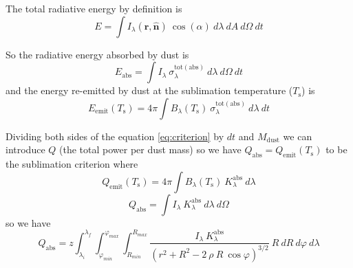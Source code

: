 \documentclass[twocolumn]{aastex62}
\begin{document}
The total radiative energy by definition \citep{mihalas1978book} is
\begin{equation}
E = \int I_{\lambda}(\textbf{r}, \hat{\textbf{n}})\ \cos(\alpha)\ d\lambda\ dA\ d\Omega\ dt
\end{equation}

So the radiative energy absorbed by dust is
\begin{equation}
E_{\mathrm{abs}} = \int I_{\lambda}\ \sigma^{\mathrm{tot(abs)}}_{\lambda}\ d\lambda\ d\Omega\ dt
\end{equation}
and the energy re-emitted by dust \citep{Loska1993} at the sublimation temperature ($T_{\mathrm{s}}$) is
\begin{equation}
E_{\mathrm{emit}}(T_{\mathrm{s}}) = 4 \pi \int B_{\lambda}(T_{\mathrm{s}})\ \sigma^{\mathrm{tot(abs)}}_{\lambda}\ d\lambda\ dt
\end{equation}

Dividing both sides of the equation \ref{eq:criterion} by $dt$ and $M_{\mathrm{dust}}$ we can introduce $Q$ (the total power per dust mass) so we have
$Q_{\mathrm{abs}} = Q_{\mathrm{emit}} (T_{\mathrm{s}})
$ to be the sublimation criterion where
\begin{equation}
Q_{\mathrm{emit}} (T_{\mathrm{s}}) = 4 \pi \int B_{\lambda}(T_{\mathrm{s}})\ K^{\mathrm{abs}}_{\lambda}\ d\lambda
\end{equation}
\begin{equation}
Q_{\mathrm{abs}} = \int I_{\lambda}\ K^{\mathrm{abs}}_{\lambda}\ d\lambda\ d\Omega
\end{equation}
so we have
\begin{equation}
\label{eq:Qabs}
Q_{\mathrm{abs}} = z
\int_{\lambda_{i}}^{\lambda_{f}}
\int_{\varphi_{min}}^{\varphi_{max}}
\int_{R_{min}}^{R_{max}}
\frac{I_{\lambda}\  K^{\mathrm{abs}}_{\lambda}}
{\left( r^2 + R^2 - 2\ \rho\ R\ \cos\varphi \right) ^{3/2}}\  R\ dR\ d\varphi\ d\lambda
\end{equation}



\end{document}
